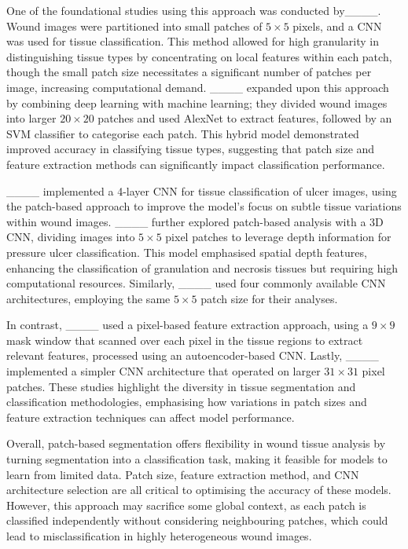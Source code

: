 One of the foundational studies using this approach was conducted by____. Wound images were partitioned into small patches of $5\times5$ pixels, and a CNN was used for tissue classification. This method allowed for high granularity in distinguishing tissue types by concentrating on local features within each patch, though the small patch size necessitates a significant number of patches per image, increasing computational demand. ____ expanded upon this approach by combining deep learning with machine learning; they divided wound images into larger $20\times20$ patches and used AlexNet to extract features, followed by an SVM classifier to categorise each patch. This hybrid model demonstrated improved accuracy in classifying tissue types, suggesting that patch size and feature extraction methods can significantly impact classification performance.

____ implemented a 4-layer CNN for tissue classification of ulcer images, using the patch-based approach to improve the model's focus on subtle tissue variations within wound images. ____ further explored patch-based analysis with a 3D CNN, dividing images into $5\times5$ pixel patches to leverage depth information for pressure ulcer classification. This model emphasised spatial depth features, enhancing the classification of granulation and necrosis tissues but requiring high computational resources. Similarly, ____ used four commonly available CNN architectures, employing the same $5 \times 5$ patch size for their analyses.

In contrast, ____ used a pixel-based feature extraction approach, using a $9 \times 9$ mask window that scanned over each pixel in the tissue regions to extract relevant features, processed using an autoencoder-based CNN. Lastly, ____ implemented a simpler CNN architecture that operated on larger $31 \times 31$ pixel patches. These studies highlight the diversity in tissue segmentation and classification methodologies, emphasising how variations in patch sizes and feature extraction techniques can affect model performance.

Overall, patch-based segmentation offers flexibility in wound tissue analysis by turning segmentation into a classification task, making it feasible for models to learn from limited data. Patch size, feature extraction method, and CNN architecture selection are all critical to optimising the accuracy of these models. However, this approach may sacrifice some global context, as each patch is classified independently without considering neighbouring patches, which could lead to misclassification in highly heterogeneous wound images.



